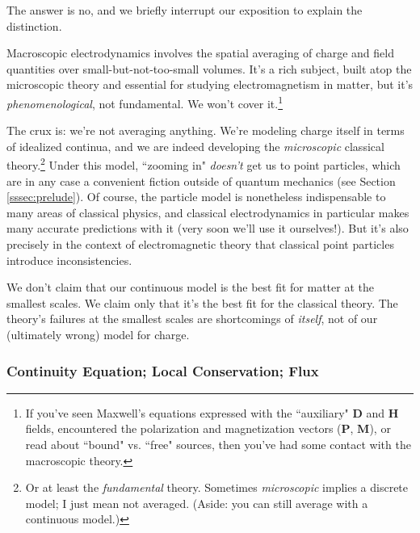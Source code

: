 \documentclass[12pt]{article}
\renewcommand{\vv}[1]{\mathbf{#1}}
\begin{document}
The answer is no, and we briefly interrupt our exposition to explain the distinction.

Macroscopic electrodynamics involves the spatial averaging of charge and field quantities over small-but-not-too-small volumes. It's a rich subject, built atop the microscopic theory and essential for studying electromagnetism in matter, but it's \emph{phenomenological}, not fundamental. We won't cover it.\footnote{If you’ve seen Maxwell’s equations expressed with the ``auxiliary" $\vv D$ and $\vv H$ fields, encountered the polarization and magnetization vectors ($\vv P$, $\vv M$), or read about ``bound" vs. ``free" sources, then you’ve had some contact with the macroscopic theory.}

The crux is: we're not averaging anything. We're modeling charge itself in terms of idealized continua, and we are indeed developing the \emph{microscopic} classical theory.\footnote{Or at least the \emph{fundamental} theory. Sometimes \emph{microscopic} implies a discrete model; I just mean not averaged. (Aside: you can still average with a continuous model.)} Under this model, ``zooming in" \emph{doesn't} get us to point particles, which are in any case a convenient fiction outside of quantum mechanics (see Section \ref{sssec:prelude}). Of course, the particle model is nonetheless indispensable to many areas of classical physics, and classical electrodynamics in particular makes many accurate predictions with it (very soon we'll use it ourselves!). But it's also precisely in the context of electromagnetic theory that classical point particles introduce inconsistencies.

We don't claim that our continuous model is the best fit for matter at the smallest scales. We claim only that it's the best fit for the classical theory. The theory's failures at the smallest scales are shortcomings of \emph{itself}, not of our (ultimately wrong) model for charge.

\subsubsection{Continuity Equation; Local Conservation; Flux}\label{sssec:cont}
\end{document}
